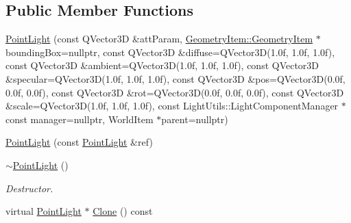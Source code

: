 \subsection*{Public Member Functions}
\begin{DoxyCompactItemize}
\item 
\mbox{\hyperlink{class_geometry_engine_1_1_geometry_world_item_1_1_geometry_light_1_1_point_light_a0cf0ecde6ba36c155faa56daaead3081}{Point\+Light}} (const Q\+Vector3D \&att\+Param, \mbox{\hyperlink{class_geometry_engine_1_1_geometry_world_item_1_1_geometry_item_1_1_geometry_item}{Geometry\+Item\+::\+Geometry\+Item}} $\ast$bounding\+Box=nullptr, const Q\+Vector3D \&diffuse=Q\+Vector3D(1.\+0f, 1.\+0f, 1.\+0f), const Q\+Vector3\+D \&ambient=\+Q\+Vector3\+D(1.\+0f, 1.\+0f, 1.\+0f), const Q\+Vector3\+D \&specular=\+Q\+Vector3\+D(1.\+0f, 1.\+0f, 1.\+0f), const Q\+Vector3\+D \&pos=\+Q\+Vector3\+D(0.\+0f, 0.\+0f, 0.\+0f), const Q\+Vector3\+D \&rot=\+Q\+Vector3\+D(0.\+0f, 0.\+0f, 0.\+0f), const Q\+Vector3\+D \&scale=\+Q\+Vector3\+D(1.\+0f, 1.\+0f, 1.\+0f), const Light\+Utils\+::\+Light\+Component\+Manager $\ast$const manager=nullptr, World\+Item $\ast$parent=nullptr)
\item 
\mbox{\hyperlink{class_geometry_engine_1_1_geometry_world_item_1_1_geometry_light_1_1_point_light_af70f4dc5a17066a9f46e8d98931a1204}{Point\+Light}} (const \mbox{\hyperlink{class_geometry_engine_1_1_geometry_world_item_1_1_geometry_light_1_1_point_light}{Point\+Light}} \&ref)
\item 
\mbox{\label{class_geometry_engine_1_1_geometry_world_item_1_1_geometry_light_1_1_point_light_a36e386c17ee8ddd000b5d85e5b8b3bfb}} 
\mbox{\hyperlink{class_geometry_engine_1_1_geometry_world_item_1_1_geometry_light_1_1_point_light_a36e386c17ee8ddd000b5d85e5b8b3bfb}{$\sim$\+Point\+Light}} ()
\begin{DoxyCompactList}\small\item\em Destructor. \end{DoxyCompactList}\item 
virtual \mbox{\hyperlink{class_geometry_engine_1_1_geometry_world_item_1_1_geometry_light_1_1_point_light}{Point\+Light}} $\ast$ \mbox{\hyperlink{class_geometry_engine_1_1_geometry_world_item_1_1_geometry_light_1_1_point_light_a68321b758cff76fa55f3cd5ef2824035}{Clone}} () const
\end{DoxyCompactItemize}
